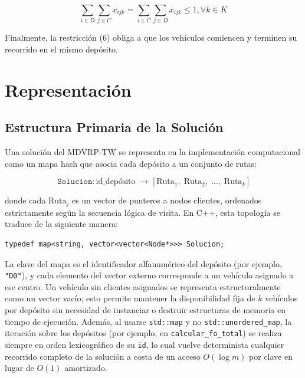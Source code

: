 \documentclass[letter, 10pt]{article}
\begin{document}
\begin{equation}
\sum_{i \in D} \sum_{j \in C} x_{ijk} = \sum_{i \in C} \sum_{j \in D} x_{ijk} \leq 1, \forall k \in K
\end{equation}

Finalmente, la restricci\'on (6) obliga a que los veh\'iculos comiencen y terminen su recorrido en el mismo dep\'osito.

\section{Representaci\'on}

\subsection{Estructura Primaria de la Soluci\'on}

Una soluci\'on del MDVRP-TW se representa en la implementaci\'on computacional como un mapa hash que asocia cada dep\'osito a un conjunto de rutas:

\[
\texttt{Solucion} : \text{id\_dep\'osito} \;\longrightarrow\; \bigl[ \,\text{Ruta}_1,\; \text{Ruta}_2,\; \ldots,\; \text{Ruta}_k \,\bigr]
\]

donde cada $\text{Ruta}_j$ es un vector de punteros a nodos clientes, ordenados estrictamente seg\'un la secuencia l\'ogica de visita. En C++, esta topolog\'ia se traduce de la siguiente manera:

\begin{verbatim}
typedef map<string, vector<vector<Node*>>> Solucion;
\end{verbatim}

La clave del mapa es el identificador alfanum\'erico del dep\'osito (por ejemplo, \texttt{"D0"}), y cada elemento del vector externo corresponde a un veh\'iculo asignado a ese centro. Un veh\'iculo sin clientes asignados se representa estructuralmente como un vector vac\'io; esto permite mantener la disponibilidad fija de $k$ veh\'iculos por dep\'osito sin necesidad de instanciar o destruir estructuras de memoria en tiempo de ejecuci\'on. Adem\'as, al usarse \texttt{std::map} y no \texttt{std::unordered\_map}, la iteraci\'on sobre los dep\'ositos (por ejemplo, en \texttt{calcular\_fo\_total}) se realiza siempre en orden lexicogr\'afico de su \texttt{id}, lo cual vuelve determinista cualquier recorrido completo de la soluci\'on a costa de un acceso $O(\log m)$ por clave en lugar de $O(1)$ amortizado.
\end{document}
